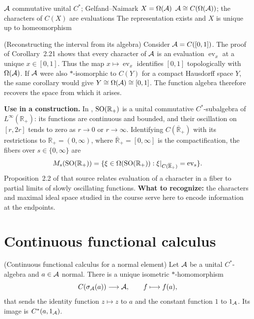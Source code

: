 \proofdiagram
{$\mathcal A$ commutative unital $C^*$; Gelfand--Naimark}
{$X=\Omega(\mathcal A)$}
{$\mathcal A\cong C(\Omega(\mathcal A))$; the characters of $C(X)$ are evaluations}
{The representation exists and $X$ is unique up to homeomorphism}

\begin{cthejemplo}{(Reconstructing the interval from its algebra)}
Consider $\mathcal A=C([0,1])$. The proof of Corollary~2.21 shows that every
character of $\mathcal A$ is an evaluation $\operatorname{ev}_x$ at a unique
$x\in[0,1]$. Thus the map $x\mapsto\operatorname{ev}_x$ identifies
$[0,1]$ topologically with $\Omega(\mathcal A)$.
If $\mathcal A$ were also $*$-isomorphic to $C(Y)$ for a compact Hausdorff space $Y$,
the same corollary would give $Y\cong\Omega(\mathcal A)\cong[0,1]$.
The function algebra therefore recovers the space from which it arises.
\end{cthejemplo}

\begin{investigacion}[unbreakable]
\textbf{Use in a construction.} In \cite[Sec.~2, pp.~465--466]{Karlovich2017},
$\operatorname{SO}(\mathbb R_+)$ is a unital commutative $C^*$-subalgebra of
$L^\infty(\mathbb R_+)$: its functions are continuous and bounded, and their
oscillation on $[r,2r]$ tends to zero as $r\to0$ or $r\to\infty$.
Identifying $C(\overline{\mathbb R}_+)$ with its restrictions to
$\mathbb R_+=(0,\infty)$, where $\overline{\mathbb R}_+=[0,\infty]$ is the
compactification, the fibers over $s\in\{0,\infty\}$ are
\[
 M_s(\operatorname{SO}(\mathbb R_+))=
 \{\xi\in\Omega(\operatorname{SO}(\mathbb R_+)):
 \xi|_{C(\overline{\mathbb R}_+)}=\operatorname{ev}_s\}.
\]
Proposition~2.2 of that source relates evaluation of a character in a fiber
to partial limits of slowly oscillating functions.
\textbf{What to recognize:} the characters and maximal ideal space studied
in the course serve here to encode information at the endpoints.
\end{investigacion}

\section{Continuous functional calculus}

\begin{cthteorema}{(Continuous functional calculus for a normal element)}
Let $\mathcal A$ be a unital $C^*$-algebra and $a\in\mathcal A$ normal. There is a unique
isometric $*$-homomorphism
\[
 C(\sigma_\mathcal A(a))\longrightarrow\mathcal A,
 \qquad f\longmapsto f(a),
\]
that sends the identity function $z\mapsto z$ to $a$ and the constant
function $1$ to $1_\mathcal A$. Its image is $C^*(a,1_\mathcal A)$.
\end{cthteorema}

